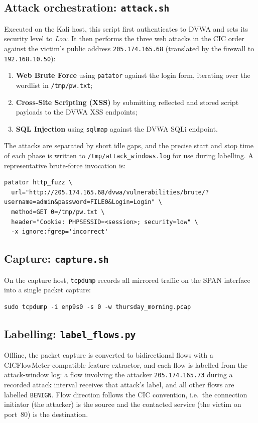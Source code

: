 \documentclass[11pt]{article}
\begin{document}
\subsection{Attack orchestration: \texttt{attack.sh}}
Executed on the Kali host, this script first authenticates to DVWA and sets its
security level to \emph{Low}. It then performs the three web attacks in the CIC
order against the victim's public address \texttt{205.174.165.68} (translated by
the firewall to \texttt{192.168.10.50}):
\begin{enumerate}
  \item \textbf{Web Brute Force} using \texttt{patator} against the login form,
        iterating over the wordlist in \texttt{/tmp/pw.txt};
  \item \textbf{Cross-Site Scripting (XSS)} by submitting reflected and stored
        script payloads to the DVWA XSS endpoints;
  \item \textbf{SQL Injection} using \texttt{sqlmap} against the DVWA SQLi
        endpoint.
\end{enumerate}
The attacks are separated by short idle gaps, and the precise start and stop time
of each phase is written to \texttt{/tmp/attack\_windows.log} for use during
labelling. A representative brute-force invocation is:
\begin{lstlisting}
patator http_fuzz \
  url="http://205.174.165.68/dvwa/vulnerabilities/brute/?username=admin&password=FILE0&Login=Login" \
  method=GET 0=/tmp/pw.txt \
  header="Cookie: PHPSESSID=<session>; security=low" \
  -x ignore:fgrep='incorrect'
\end{lstlisting}

\subsection{Capture: \texttt{capture.sh}}
On the capture host, \texttt{tcpdump} records all mirrored traffic on the SPAN
interface into a single packet capture:
\begin{lstlisting}
sudo tcpdump -i enp9s0 -s 0 -w thursday_morning.pcap
\end{lstlisting}

\subsection{Labelling: \texttt{label\_flows.py}}
Offline, the packet capture is converted to bidirectional flows with a
CICFlowMeter-compatible feature extractor, and each flow is labelled from the
attack-window log: a flow involving the attacker \texttt{205.174.165.73} during a
recorded attack interval receives that attack's label, and all other flows are
labelled \texttt{BENIGN}. Flow direction follows the CIC convention, i.e.\ the
connection initiator (the attacker) is the source and the contacted service (the
victim on port~80) is the destination.
\end{document}
